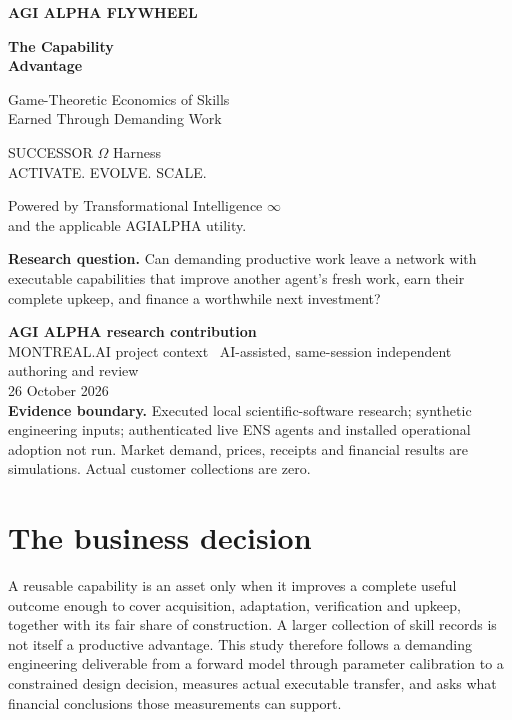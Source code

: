 \documentclass[11pt,letterpaper]{article}
\begin{document}
\hypersetup{pageanchor=false}
\begin{titlepage}
\vspace*{0.45in}
{\large\bfseries\color{accent} AGI ALPHA FLYWHEEL\par}
\vspace{0.35in}
{\Huge\bfseries\color{deep} The Capability\\[7pt] Advantage\par}
\vspace{0.28in}
{\Large Game-Theoretic Economics of Skills\\Earned Through Demanding Work\par}
\vspace{0.4in}
{\large SUCCESSOR $\Omega$ Harness\\ACTIVATE. EVOLVE. SCALE.\par}
{\normalsize Powered by Transformational Intelligence $\infty$\\and the applicable AGIALPHA utility.\par}
\vspace{0.5in}
\colorbox{light}{\parbox{0.93\textwidth}{\vspace{8pt}
\textbf{Research question.} Can demanding productive work leave a network with executable capabilities that improve another agent's fresh work, earn their complete upkeep, and finance a worthwhile next investment?
\vspace{8pt}}}
\vfill
\textbf{AGI ALPHA research contribution}\\
MONTREAL.AI project context \textbar\ AI-assisted, same-session independent authoring and review\\
26 October 2026\\[8pt]
\textbf{Evidence boundary.} Executed local scientific-software research; synthetic engineering inputs; authenticated live ENS agents and installed operational adoption not run. Market demand, prices, receipts and financial results are simulations. Actual customer collections are zero.
\end{titlepage}
\hypersetup{pageanchor=true}



\section{The business decision}

A reusable capability is an asset only when it improves a complete useful outcome enough to cover acquisition, adaptation, verification and upkeep, together with its fair share of construction. A larger collection of skill records is not itself a productive advantage. This study therefore follows a demanding engineering deliverable from a forward model through parameter calibration to a constrained design decision, measures actual executable transfer, and asks what financial conclusions those measurements can support.
\end{document}
